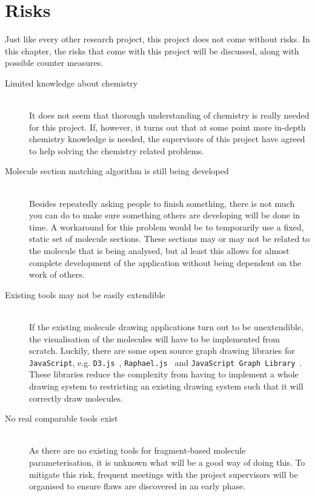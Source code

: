 \chapter{Risks}

Just like every other research project, this project does not come without risks. In this chapter, the risks that come with this project will be discussed, along with possible counter measures.

\begin{description}
\item[Limited knowledge about chemistry]~~\\
It does not seem that thorough understanding of chemistry is really needed for this project. If, however, it turns out that at some point more in-depth chemistry knowledge is needed, the supervisors of this project have agreed to help solving the chemistry related problems.

\item[Molecule section matching algorithm is still being developed]~~\\
Besides repeatedly asking people to finish something, there is not much you can do to make sure something others are developing will be done in time. A workaround for this problem would be to temporarily use a fixed, static set of molecule sections. These sections may or may not be related to the molecule that is being analysed, but al least this allows for almost complete development of the application without being dependent on the work of others.

\item[Existing tools may not be easily extendible]~~\\
If the existing molecule drawing applications turn out to be unextendible, the visualisation of the molecules will have to be implemented from scratch. Luckily, there are some open source graph drawing libraries for \verb|JavaScript|, e.g. \verb|D3.js|~\cite{bostock2012data}, \verb|Raphael.js|~\cite{baranovski2013raphael} and \verb|JavaScript Graph Library|~\cite{dracula2012javascript}. These libraries reduce the complexity from having to implement a whole drawing system to restricting an existing drawing system such that it will correctly draw molecules. 

\item[No real comparable tools exist]~~\\
As there are no existing tools for fragment-based molecule parameterisation, it is unknown what will be a good way of doing this. To mitigate this risk, frequent meetings with the project supervisors will be organised to ensure flaws are discovered in an early phase.
\end{description}

